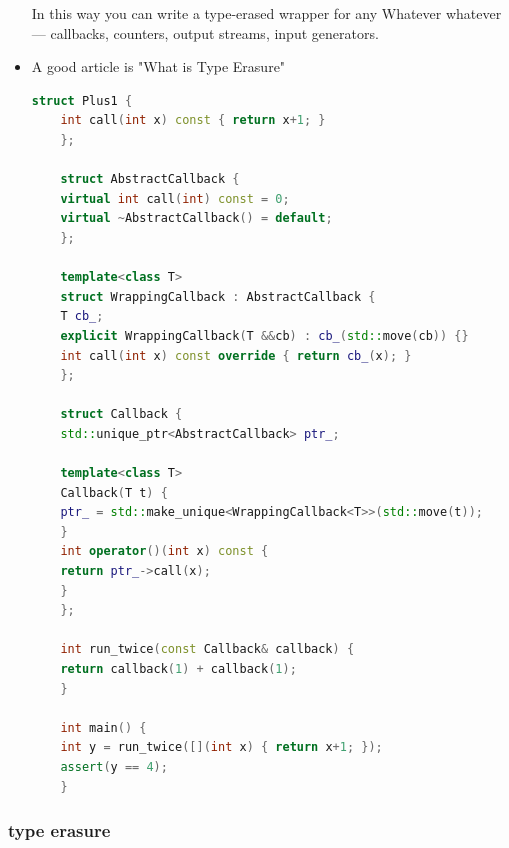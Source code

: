 \documentclass[a4paper,12pt,twoside]{book}
\begin{document}
\begin{itemize}
	In this way you can write a type-erased wrapper for any Whatever whatever — callbacks, counters, output streams, input generators.
	
	\item A good article is "What is Type Erasure"
	\begin{lstlisting}[frame=single, language=c++]
	struct Plus1 {
	int call(int x) const { return x+1; }
	};
	
	struct AbstractCallback {
	virtual int call(int) const = 0;
	virtual ~AbstractCallback() = default;
	};
	
	template<class T>
	struct WrappingCallback : AbstractCallback {
	T cb_;
	explicit WrappingCallback(T &&cb) : cb_(std::move(cb)) {}
	int call(int x) const override { return cb_(x); }
	};
	
	struct Callback {
	std::unique_ptr<AbstractCallback> ptr_;
	
	template<class T>
	Callback(T t) {
	ptr_ = std::make_unique<WrappingCallback<T>>(std::move(t));
	}
	int operator()(int x) const {
	return ptr_->call(x);
	}
	};
	
	int run_twice(const Callback& callback) {
	return callback(1) + callback(1);
	}
	
	int main() {
	int y = run_twice([](int x) { return x+1; });
	assert(y == 4);
	}
	\end{lstlisting}
	
\end{itemize}

\subsubsection{type erasure}
\end{document}
